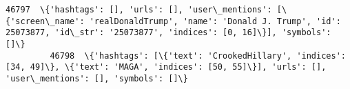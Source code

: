 \documentclass[11pt]{article}
\begin{document}
\begin{Verbatim}[commandchars=\\\{\}]
         46797  \{'hashtags': [], 'urls': [], 'user\_mentions': [\{'screen\_name': 'realDonaldTrump', 'name': 'Donald J. Trump', 'id': 25073877, 'id\_str': '25073877', 'indices': [0, 16]\}], 'symbols': []\}                                                                                                                                                                                                                                                                                                                                                                                                                                                                                                                                                                                                                                                                                                                                                                                                                                                                                                                                                                                                                        
         46798  \{'hashtags': [\{'text': 'CrookedHillary', 'indices': [34, 49]\}, \{'text': 'MAGA', 'indices': [50, 55]\}], 'urls': [], 'user\_mentions': [], 'symbols': []\}                                                                                                                                                                                                                                                                                                                                                                                                                                                                                                                                                                                                                                                                                                                                                                                                                                                                                                                                                                                                                                                         

\end{Verbatim}
\end{document}

